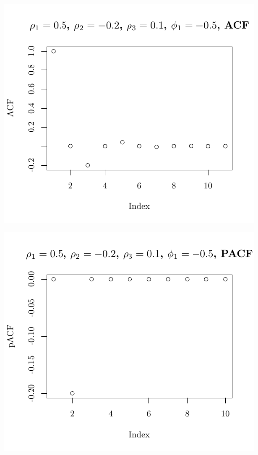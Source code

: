 \documentclass[10pt]{paper}\usepackage[]{graphicx}\usepackage[]{color}
\makeatletter
\def\maxwidth{ %
  \ifdim\Gin@nat@width>\linewidth
    \linewidth
  \else
    \Gin@nat@width
  \fi
}
\newenvironment{knitrout}{}{} %
\makeatother
\begin{document}
\begin{knitrout}
{\centering \includegraphics[width=\maxwidth]{figure/graphics-plotter-133} 

}




{\centering \includegraphics[width=\maxwidth]{figure/graphics-plotter-134} 

}





\end{knitrout}
\end{document}
